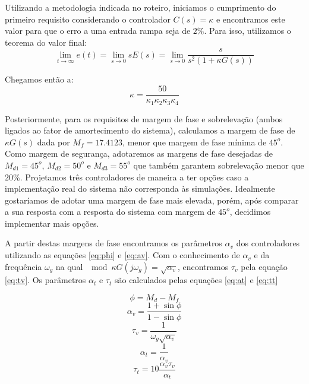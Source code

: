 \documentclass{article}
\begin{document}
Utilizando a metodologia indicada no roteiro\cite{bb:roteiro}, iniciamos o cumprimento do primeiro requisito considerando o controlador $C(s)=\kappa$ e encontramos este valor para que o erro a uma entrada rampa seja de $2\%$. Para isso, utilizamos o teorema do valor final: 
\begin{equation}
\lim_{t\to\infty}e(t)=\lim_{s\to0}sE(s) = \lim_{s\to0}\frac{s}{s^2(1+\kappa G(s))}
\end{equation}

Chegamos então a: 
\begin{equation}
	\kappa=\frac{50}{\kappa_1 \kappa_2 \kappa_3 \kappa_4}
\end{equation}

Posteriormente, para os requisitos de margem de fase e sobrelevação (ambos ligados ao fator de amortecimento do sistema), calculamos a margem de fase de $\kappa G(s)$ dada por $M_f=17.4123$, menor que margem de fase mínima de $45^o$. Como margem de segurança, adotaremos as margens de fase desejadas de $M_{d1}=45^o$, $M_{d2}=50^o$ e $M_{d3}=55^o$ que também garantem sobrelevação menor que $20\%$. Projetamos três controladores de maneira a ter opções caso a implementação real do sistema não corresponda às simulações. Idealmente gostaríamos de adotar uma margem de fase mais elevada, porém, após comparar a sua resposta com a resposta do sistema com margem de $45^o$, decidimos implementar mais opções.

A partir destas margens de fase encontramos os parâmetros $\alpha_v$ dos controladores utilizando as equações \ref{eq:phi} e \ref{eq:av}. Com o conhecimento de $\alpha_v$ e da frequência $\omega_g$ na qual $\mod{\kappa G(j\omega_g)}=\sqrt{\alpha_v}$, encontramos $\tau_v$ pela equação \ref{eq:tv}. Os parâmetros $\alpha_t$ e $\tau_t$ são calculados pelas equações \ref{eq:at} e \ref{eq:tt}

\begin{equation}
\label{eq:phi}
\phi=M_d-M_f
\end{equation}
\begin{equation}
	\label{eq:av}
	\alpha_v=\frac{1+\sin{\phi}}{1-\sin{\phi}}
\end{equation}
\begin{equation}
	\label{eq:tv}
	\tau_v=\frac{1}{\omega_g \sqrt{\alpha_v}}
\end{equation}
\begin{equation}
\label{eq:at}
\alpha_t=\frac{1}{\alpha_v}
\end{equation}
\begin{equation}
\label{eq:tt}
\tau_t=10\frac{\alpha_v \tau_v}{\alpha_t}
\end{equation}
\end{document}

